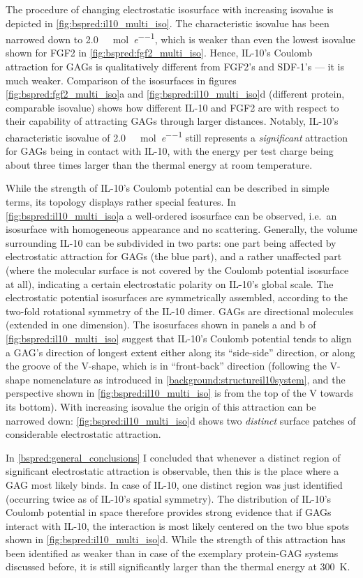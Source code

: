 The procedure of changing electrostatic isosurface with increasing isovalue is
depicted in \cref{fig:bspred:il10_multi_iso}. The characteristic isovalue has
been narrowed down to \SI{2.0}{\kilo\calory\per\mole\per\elementarycharge},
which is weaker than even the lowest isovalue shown for FGF2 in
\cref{fig:bspred:fgf2_multi_iso}. Hence, IL-10's Coulomb attraction for GAGs
is qualitatively different from FGF2's and SDF-1's --- it is much weaker.
Comparison of the isosurfaces in figures \ref{fig:bspred:fgf2_multi_iso}a and
\ref{fig:bspred:il10_multi_iso}d (different protein, comparable isovalue) shows
how different IL-10 and FGF2 are with respect to their capability of attracting
GAGs through larger distances. Notably, IL-10's characteristic isovalue of
\SI{2.0}{\kilo\calory\per\mole\per\elementarycharge} still represents a
\textit{significant} attraction for GAGs being in contact with IL-10, with the
energy per test charge being about three times larger than the thermal energy at
room temperature.

While the strength of IL-10's Coulomb potential can be described in simple
terms, its topology displays rather special features. In
\cref{fig:bspred:il10_multi_iso}a a well-ordered isosurface can be observed,
i.e.\ an isosurface with homogeneous appearance and no scattering. Generally,
the volume surrounding IL-10 can be subdivided in two parts: one part being
affected by electrostatic attraction for GAGs (the blue part), and a rather
unaffected part (where the molecular surface is not covered by the Coulomb
potential isosurface at all), indicating a certain electrostatic polarity on
IL-10's global scale. The electrostatic potential isosurfaces are symmetrically
assembled, according to the two-fold rotational symmetry of the IL-10 dimer.
GAGs are directional molecules (extended in one dimension). The isosurfaces
shown in panels a and b of \cref{fig:bspred:il10_multi_iso} suggest that IL-10's
Coulomb potential tends to align a GAG's direction of longest extent either
along its \enquote{side-side} direction, or along the groove of the V-shape,
which is in \enquote{front-back} direction (following the V-shape nomenclature
as introduced in \cref{background:structureil10system}, and the perspective
shown in \cref{fig:bspred:il10_multi_iso} is from the top of the V towards its
bottom). With increasing isovalue the origin of this attraction can be narrowed
down: \cref{fig:bspred:il10_multi_iso}d shows two \textit{distinct} surface
patches of considerable electrostatic attraction.

In \cref{bspred:general_conclusions} I concluded that whenever a distinct region
of significant electrostatic attraction is observable, then this is the place
where a GAG most likely binds. In case of IL-10, one distinct region was just
identified (occurring twice as of IL-10's spatial symmetry). The distribution of
IL-10's Coulomb potential in space therefore provides strong evidence that if
GAGs interact with IL-10, the interaction is most likely centered on the two
blue spots shown in \cref{fig:bspred:il10_multi_iso}d. While the strength of
this attraction has been identified as weaker than in case of the exemplary
protein-GAG systems discussed before, it is still significantly larger than the
thermal energy at \SI{300}{\kelvin}.


